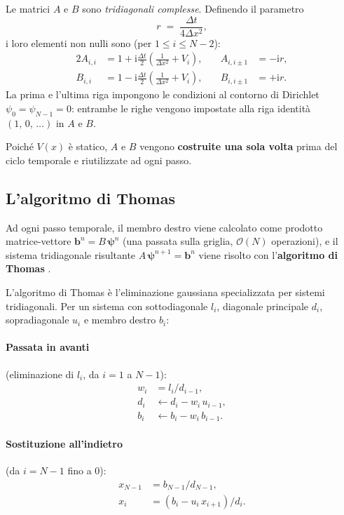 \documentclass[12pt, a4paper]{article}
\newcommand{\dt}{\Delta t}
\newcommand{\dx}{\Delta x}
\newcommand{\ii}{\mathrm{i}}          %
\begin{document}
Le matrici $A$ e $B$ sono \emph{tridiagonali complesse}. Definendo il
parametro
\begin{equation}
  r \;=\; \frac{\dt}{4\dx^2},
\end{equation}
i loro elementi non nulli sono (per $1 \leq i \leq N-2$):
\begin{alignat}{2}
  A_{i,i}   &= 1 + \ii\frac{\dt}{2}\!\left(\frac{1}{\dx^2} + V_i\right),
  &\quad A_{i,i\pm 1} &= -\ii r, \label{eq:A_elements}\\[4pt]
  B_{i,i}   &= 1 - \ii\frac{\dt}{2}\!\left(\frac{1}{\dx^2} + V_i\right),
  &\quad B_{i,i\pm 1} &= +\ii r. \label{eq:B_elements}
\end{alignat}
La prima e l'ultima riga impongono le condizioni al contorno di Dirichlet
$\psi_0 = \psi_{N-1} = 0$: entrambe le righe vengono impostate alla
riga identità $(1,\,0,\,\ldots)$ in $A$ e $B$.

Poiché $V(x)$ è statico, $A$ e $B$ vengono \textbf{costruite una sola volta}
prima del ciclo temporale e riutilizzate ad ogni passo.

\subsection{L'algoritmo di Thomas}
\label{sec:thomas}

Ad ogni passo temporale, il membro destro viene calcolato come prodotto
matrice-vettore $\mathbf{b}^n = B\,\boldsymbol{\psi}^n$ (una passata sulla
griglia, $\mathcal{O}(N)$ operazioni), e il sistema tridiagonale risultante
$A\,\boldsymbol{\psi}^{n+1} = \mathbf{b}^n$ viene risolto con
l'\textbf{algoritmo di Thomas} \cite{Thomas1949}.

L'algoritmo di Thomas è l'eliminazione gaussiana specializzata per sistemi
tridiagonali. Per un sistema con sottodiagonale $l_i$, diagonale principale
$d_i$, sopradiagonale $u_i$ e membro destro $b_i$:

\paragraph{Passata in avanti} (eliminazione di $l_i$, da $i=1$ a $N-1$):
\begin{align}
  w_i &= l_i / d_{i-1}, \\
  d_i &\leftarrow d_i - w_i\,u_{i-1}, \\
  b_i &\leftarrow b_i - w_i\,b_{i-1}.
\end{align}

\paragraph{Sostituzione all'indietro} (da $i=N-1$ fino a $0$):
\begin{align}
  x_{N-1} &= b_{N-1}/d_{N-1}, \\
  x_i     &= (b_i - u_i\,x_{i+1}) / d_i.
\end{align}
\end{document}
